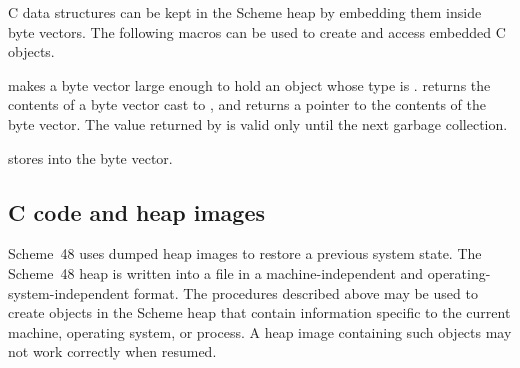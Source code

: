 C data structures can be kept in the Scheme heap by embedding them
 inside byte vectors.
The following macros can be used to create and access embedded C objects.

\begin{protos}
\end{protos}

\noindent{}
 makes a byte vector large enough to hold an object
 whose type is .
 returns the contents of a byte vector cast to
 , and  returns a pointer
 to the contents of the byte vector.
The value returned by  is valid only until
 the next garbage collection.

 stores  into the byte vector.

%

\subsection{C code and heap images}
\label{sec:hibernation}

Scheme~48 uses dumped heap images to restore a previous system state.
The Scheme~48 heap is written into a file in a machine-independent and
 operating-system-independent format.
The procedures described above may be used to create objects in the
 Scheme heap that contain information specific to the current
 machine, operating system, or process.
A heap image containing such objects may not work correctly
 when resumed.

